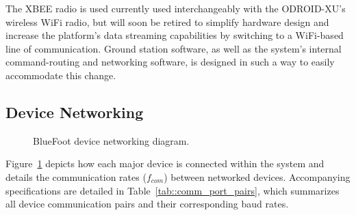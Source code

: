 				The XBEE radio is used currently used interchangeably with the ODROID-XU's wireless WiFi radio, but will soon be retired to simplify hardware design and increase the platform's data streaming capabilities by switching to a WiFi-based line of communication. Ground station software, as well as the system's internal command-routing and networking software, is designed in such a way to easily accommodate this change.

		\subsection{Device Networking}

			\begin{figure}[h!]
				\centering
				\caption{BlueFoot device networking diagram.}
				\label{fig::dev_diagram}
			\end{figure}
			
			
			Figure~\ref{fig::dev_diagram} depicts how each major device is connected within the system and details the communication rates ($f_{com}$) between networked devices. Accompanying specifications are detailed in Table~\ref{tab::comm_port_pairs}, which summarizes all device communication pairs and their corresponding baud rates.

